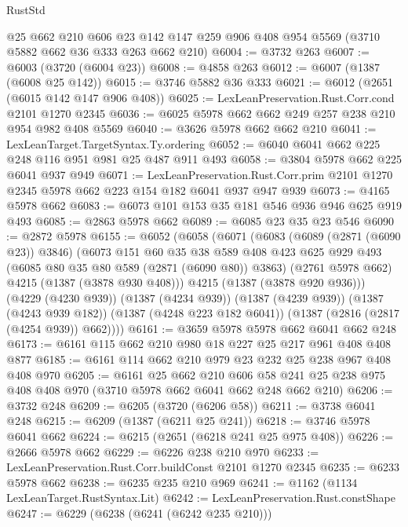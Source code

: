 \begin{lexlean}{RustStd}
\begin{coremodule}
    @25
    @662
    @210
    @606
    @23
    @142
    @147
    @259
    @906
    @408
    @954
    @5569
    (@3710 @5882 @662 @36 @333 @263 @662 @210)
@6004 := @3732 @263
@6007 := @6003 (@3720 (@6004 @23))
@6008 := @4858 @263
@6012 := @6007 (@1387 (@6008 @25 @142))
@6015 := @3746 @5882 @36 @333
@6021 := @6012 (@2651 (@6015 @142 @147 @906 @408))
@6025 := LexLeanPreservation.Rust.Corr.cond @2101 @1270 @2345
@6036 := @6025 @5978 @662 @662 @249 @257 @238 @210 @954 @982 @408 @5569
@6040 := @3626 @5978 @662 @662 @210
@6041 := LexLeanTarget.TargetSyntax.Ty.ordering
@6052 := @6040 @6041 @662 @225 @248 @116 @951 @981 @25 @487 @911 @493
@6058 := @3804 @5978 @662 @225 @6041 @937 @949
@6071 := LexLeanPreservation.Rust.Corr.prim
    @2101
    @1270
    @2345
    @5978
    @662
    @223
    @154
    @182
    @6041
    @937
    @947
    @939
@6073 := @4165 @5978 @662
@6083 := @6073 @101 @153 @35 @181 @546 @936 @946 @625 @919 @493
@6085 := @2863 @5978 @662
@6089 := @6085 @23 @35 @23 @546
@6090 := @2872 @5978
@6155 := @6052
    (@6058
      (@6071
        (@6083
          (@6089 (@2871 (@6090 @23)) @3846)
          (@6073
            @151
            @60
            @35
            @38
            @589
            @408
            @423
            @625
            @929
            @493
            (@6085 @80 @35 @80 @589 (@2871 (@6090 @80)) @3863)
            (@2761 @5978 @662)
            @4215
            (@1387 (@3878 @930 @408)))
          @4215
          (@1387 (@3878 @920 @936)))
        (@4229 (@4230 @939))
        (@1387 (@4234 @939))
        (@1387 (@4239 @939))
        (@1387 (@4243 @939 @182))
        (@1387 (@4248 @223 @182 @6041))
        (@1387 (@2816 (@2817 (@4254 @939)) @662))))
@6161 := @3659 @5978 @5978 @662 @6041 @662 @248
@6173 := @6161 @115 @662 @210 @980 @18 @227 @25 @217 @961 @408 @408 @877
@6185 := @6161 @114 @662 @210 @979 @23 @232 @25 @238 @967 @408 @408 @970
@6205 := @6161
    @25
    @662
    @210
    @606
    @58
    @241
    @25
    @238
    @975
    @408
    @408
    @970
    (@3710 @5978 @662 @6041 @662 @248 @662 @210)
@6206 := @3732 @248
@6209 := @6205 (@3720 (@6206 @58))
@6211 := @3738 @6041 @248
@6215 := @6209 (@1387 (@6211 @25 @241))
@6218 := @3746 @5978 @6041 @662
@6224 := @6215 (@2651 (@6218 @241 @25 @975 @408))
@6226 := @2666 @5978 @662
@6229 := @6226 @238 @210 @970
@6233 := LexLeanPreservation.Rust.Corr.buildConst @2101 @1270 @2345
@6235 := @6233 @5978 @662
@6238 := @6235 @235 @210 @969
@6241 := @1162 (@1134 LexLeanTarget.RustSyntax.Lit)
@6242 := LexLeanPreservation.Rust.constShape
@6247 := @6229 (@6238 (@6241 (@6242 @235 @210)))

\end{coremodule}
\end{lexlean}
